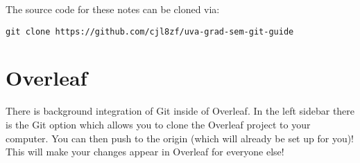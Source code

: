 \documentclass{article}
\begin{document}
The source code for these notes can be cloned via:
\begin{lstlisting}
git clone https://github.com/cjl8zf/uva-grad-sem-git-guide
\end{lstlisting}

\section{Overleaf}
There is background integration of Git inside of Overleaf. In the left
sidebar there is the Git option which allows you to clone the Overleaf
project to your computer. You can then push to the origin (which will
already be set up for you)! This will make your changes appear in
Overleaf for everyone else! 
\end{document}
